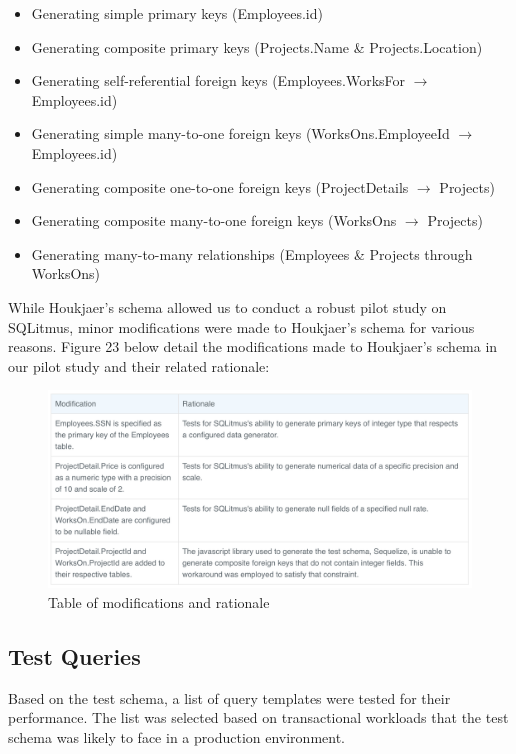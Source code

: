 \documentclass[12pt]{article}
\begin{document}
\begin{spacing}{1.9}
\begin{itemize}
		\item Generating simple primary keys (Employees.id)
		\item Generating composite primary keys (Projects.Name \& Projects.Location)
		\item Generating self-referential foreign keys (Employees.WorksFor $\xrightarrow{}$ Employees.id)
		\item Generating simple many-to-one foreign keys (WorksOns.EmployeeId $\xrightarrow{}$ Employees.id)
		\item Generating composite one-to-one foreign keys (ProjectDetails $\xrightarrow{}$ Projects)
		\item Generating composite many-to-one foreign keys (WorksOns $\xrightarrow{}$ Projects)
		\item Generating many-to-many relationships (Employees \& Projects through WorksOns)
	\end{itemize}
	While Houkjaer's schema allowed us to conduct a robust pilot study on SQLitmus, minor modifications were made to Houkjaer's schema for various reasons. Figure 23 below detail the modifications made to Houkjaer's schema in our pilot study and their related rationale:
	
	
	\begin{figure}[H]
		\centering
		\includegraphics[width=\textwidth]{4-1b.png}
		\caption{Table of modifications and rationale }
		
	\end{figure}
	
	
	
	\pagebreak
	
	\subsection{ Test Queries}
	
	Based on the test schema, a list of query templates were tested for their performance. The list was selected based on transactional workloads that the test schema was likely to face in a production environment.
	

\end{spacing}
\end{document}

